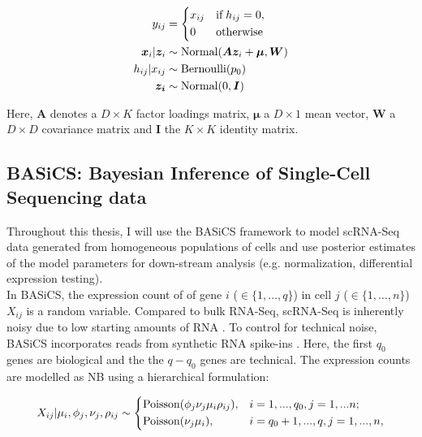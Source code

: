 \begin{align*}
y_{ij} & = 
 \left\lbrace
  \begin{aligned}
    & x_{ij} && \textnormal{if} \; h_{ij} = 0,  \\ 
    & 0 && \textnormal{otherwise}    	    
  \end{aligned}
\right.\\
\bm{x}_{i}|\bm{z}_i&\sim{}\textnormal{Normal}(\bm{Az}_i+\bm{\mu},\bm{W})\\
h_{ij}|x_{ij} & \sim \textnormal{Bernoulli}(p_0)\\
\bm{z_i}&\sim{}\textnormal{Normal}(0,\bm{I})
\end{align*} 

Here, $\bm{A}$ denotes a $D\times{}K$ factor loadings matrix, $\bm{\mu}$ a $D\times{}1$ mean vector, $\bm{W}$ a $D\times{}D$ covariance matrix and $\bm{I}$ the $K\times{}K$ identity matrix.

\newpage

\subsection{BASiCS: Bayesian Inference of Single-Cell Sequencing data} 
\label{sec0:BASiCS}

Throughout this thesis, I will use the \gls{BASiCS} framework \citep{Vallejos2015BASiCS, Vallejos2016} to model scRNA-Seq data generated from homogeneous populations of cells and use posterior estimates of the model parameters for down-stream analysis (e.g. normalization, differential expression testing).\\

In BASiCS, the expression count of of gene $i$ ($ \in \{1, \ldots, q\}$) in cell $j$ ($\in \{ 1, \ldots ,n\}$) $X_{ij}$ is a random variable. Compared to bulk RNA-Seq, scRNA-Seq is inherently noisy due to low starting amounts of RNA \citep{Brennecke2013}. To control for technical noise, BASiCS incorporates reads from synthetic RNA spike-ins \citep{Jiang2011}. Here, the first $q_0$ genes are biological and the  the $q-q_0$ genes are technical. The expression counts are modelled as NB using a hierarchical formulation:

\begin{equation} 
 X_{ij}|\mu_i,\phi_j,\nu_j,\rho_{ij} \sim
 \left\lbrace
  \begin{aligned}
    &\textnormal{Poisson}(\phi_j\nu_j\mu_i\rho_{ij}), && i=1,...,q_0,j=1,...n;  \\ 
    &\textnormal{Poisson}(\nu_j\mu_i), && i=q_0+1,...,q,j=1,...,n,    	    
  \end{aligned}
\right.
\end{equation} 

